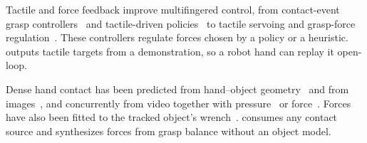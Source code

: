 Tactile and force feedback improve multifingered control, from contact-event grasp controllers~\citep{romano2011} and tactile-driven policies~\citep{tdex, vitac3d} to tactile servoing and grasp-force regulation~\citep{tactileservo, graspadapt, slipgrip}. These controllers regulate forces chosen by a policy or a heuristic. \ours outputs tactile targets from a demonstration, so a robot hand can replay it open-loop.

Dense hand contact has been predicted from hand--object geometry~\citep{grady2021contactopt} and from images~\citep{haco}, and concurrently from video together with pressure~\citep{jeon2026hope, moon2026rlhnd} or force~\citep{ilic2026egophi}. Forces have also been fitted to the tracked object's wrench~\citep{pham2015force, pham2018}. \ours consumes any contact source and synthesizes forces from grasp balance without an object model.

